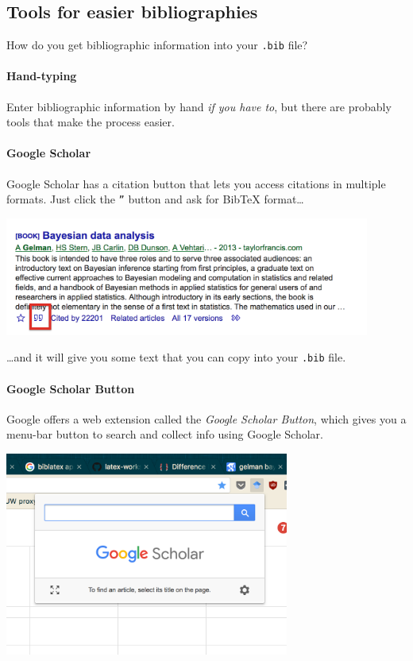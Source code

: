 \documentclass[12pt
              ]{article}
\begin{document}
\subsection{Tools for easier bibliographies}

How do you get bibliographic information into your \texttt{.bib} file?

\paragraph{Hand-typing} Enter bibliographic information by hand \emph{if you have to}, but there are probably tools that make the process easier.

\paragraph{Google Scholar} 
Google Scholar has a citation button that lets you access citations in multiple formats. Just click the \texttt{''} button and ask for Bib{\TeX} format\ldots
  \begin{center}
    \includegraphics[width = 0.9\textwidth]{graphics/scholar.png}
  \end{center}
\ldots and it will give you some text that you can copy into your \texttt{.bib} file.

\paragraph{Google Scholar Button} Google offers a web extension called the \emph{Google Scholar Button}, which gives you a menu-bar button to search and collect info using Google Scholar. 
\begin{center}
  \includegraphics[width = 0.7\textwidth]{graphics/scholar-button.png}
\end{center}
\end{document}
